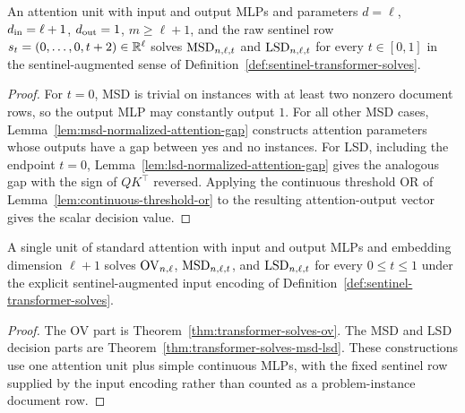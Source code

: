 \begin{theorem}
  \label{thm:transformer-solves-msd-lsd}
  An attention unit with input and output MLPs and parameters
  $d=\ell$, $d_{\rm in}=\ell+1$, $d_{\rm out}=1$, $m\geq\ell+1$, and the raw
  sentinel row $s_t=(0,\ldots,0,t+2)\in\mathbb{R}^\ell$ solves $\mathrm{MSD}_{n,\ell,t}$ and
  $\mathrm{LSD}_{n,\ell,t}$ for every $t\in[0,1]$ in the sentinel-augmented sense of
  Definition~\ref{def:sentinel-transformer-solves}.
\end{theorem}
\begin{proof}
  For $t=0$, MSD is trivial on instances with at least two nonzero document
  rows, so the output MLP may constantly output $1$.  For all other MSD cases,
  Lemma~\ref{lem:msd-normalized-attention-gap} constructs attention parameters
  whose outputs have a gap between yes and no instances.  For LSD, including
  the endpoint $t=0$, Lemma~\ref{lem:lsd-normalized-attention-gap} gives the
  analogous gap with the sign of $QK^\top$ reversed.  Applying the continuous
  threshold OR of Lemma~\ref{lem:continuous-threshold-or} to the resulting
  attention-output vector gives the scalar decision value.
\end{proof}

\begin{theorem}
  \label{thm:intro-transformer-strength}
  A single unit of standard attention with input and output MLPs and embedding
  dimension $\ell+1$ solves $\mathrm{OV}_{n,\ell}$, $\mathrm{MSD}_{n,\ell,t}$, and
  $\mathrm{LSD}_{n,\ell,t}$ for every $0\leq t\leq1$ under the explicit
  sentinel-augmented input encoding of
  Definition~\ref{def:sentinel-transformer-solves}.
\end{theorem}
\begin{proof}
  The OV part is Theorem~\ref{thm:transformer-solves-ov}.  The MSD and LSD
  decision parts are Theorem~\ref{thm:transformer-solves-msd-lsd}.  These
  constructions use one attention unit plus simple continuous MLPs, with the
  fixed sentinel row supplied by the input encoding rather than counted as a
  problem-instance document row.
\end{proof}
